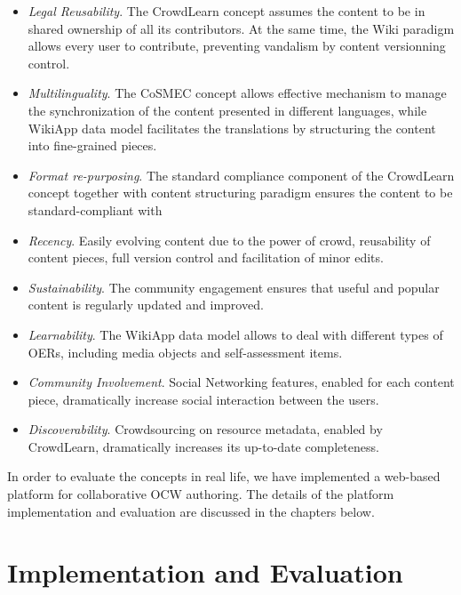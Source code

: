 \documentclass[ngerman,UKenglish,table]{scrbook}
\begin{document}
\begin{itemize}
\item \emph{Legal Reusability}. The CrowdLearn concept assumes the content to be in shared ownership of all its contributors. At the same time, the Wiki paradigm allows every user to contribute, preventing vandalism by content versionning control.
\item \emph{Multilinguality}. The CoSMEC concept allows effective mechanism to manage the synchronization of the content presented in different languages, while WikiApp data model facilitates the translations by structuring the content into fine-grained pieces.
\item \emph{Format re-purposing}. The standard compliance component of the CrowdLearn concept together with content structuring paradigm  ensures the content to be standard-compliant with 
\item \emph{Recency}. Easily evolving content due to the power of crowd, reusability of content pieces, full version control and facilitation of minor edits.
\item \emph{Sustainability}. The community engagement ensures that useful and popular content is regularly updated and improved.
\item \emph{Learnability}. The WikiApp data model allows to deal with different types of OERs, including media objects and self-assessment items.
\item \emph{Community Involvement}. Social Networking features, enabled for each content piece, dramatically increase social interaction between the users. 
\item \emph{Discoverability}. Crowdsourcing on resource metadata, enabled by CrowdLearn, dramatically increases its up-to-date completeness. 
\end{itemize}





In order to evaluate the concepts in real life, we have implemented a web-based platform for collaborative OCW authoring.
The details of the platform implementation and evaluation are discussed in the chapters below. 

\chapter{Implementation and Evaluation}
\label{chapter:implementation}
\end{document}
